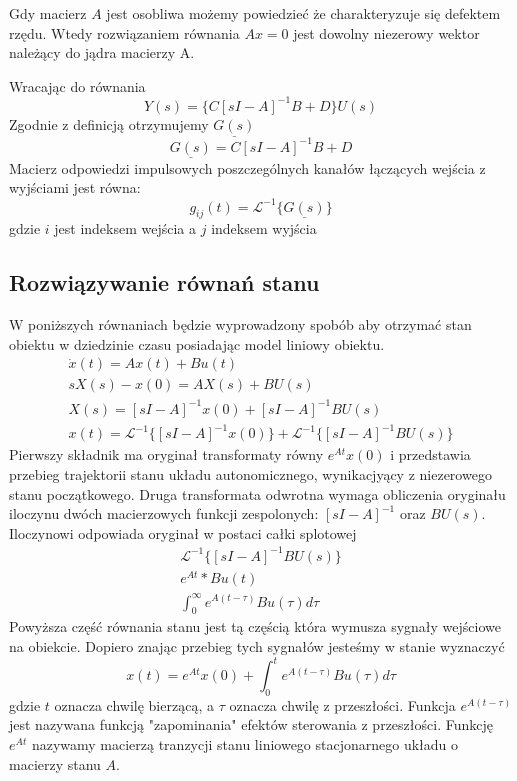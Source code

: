 \documentclass{article}
\begin{document}
		Gdy macierz $A$ jest osobliwa możemy powiedzieć że charakteryzuje się defektem rzędu.
		Wtedy rozwiązaniem równania $Ax=0$ jest dowolny niezerowy wektor należący do 
		jądra macierzy A.
		
		Wracając do równania
		\begin{equation}
			Y(s) = \{C[sI-A]^{-1}B+D\}U(s)
		\end{equation}
		Zgodnie z definicją otrzymujemy $\underline{G(s)}$ 
		\begin{equation}
			\underline{G(s)} = C[sI-A]^{-1}B+D
		\end{equation}
		Macierz odpowiedzi impulsowych poszczególnych kanałów łączących wejścia z
		wyjściami jest równa:
		\begin{equation}
			g_{ij}(t) = \mathcal{L}^{-1}\{ \underline{G(s)} \}
		\end{equation}
		gdzie $i$ jest indeksem wejścia a $j$ indeksem wyjścia
	\subsection{Rozwiązywanie równań stanu}
		W poniższych równaniach będzie wyprowadzony spobób aby otrzymać 
		stan obiektu w dziedzinie czasu posiadając model liniowy obiektu.
		\begin{align*}
			\dot{x}(t) = Ax(t)+Bu(t) \\
			sX(s) - x(0) = AX(s) + BU(s) \\
			X(s) = [sI-A]^{-1}x(0) + [sI-A]^{-1}BU(s) \\
			x(t) = \mathcal{L}^{-1}\{ [sI-A]^{-1}x(0) \} + \mathcal{L}^{-1}\{ [sI-A]^{-1}BU(s) \} 
		\end{align*}
		Pierwszy składnik ma oryginał transformaty równy $e^{At}x(0)$ i przedstawia przebieg
		trajektorii stanu układu autonomicznego, wynikacjyący z niezerowego stanu początkowego.
		Druga transformata odwrotna wymaga obliczenia oryginału iloczynu dwóch macierzowych funkcji zespolonych: $[sI-A]^{-1}$ oraz $BU(s)$. Iloczynowi odpowiada oryginał w postaci całki
		splotowej
		\begin{align*}
			\mathcal{L}^{-1}\{ [sI-A]^{-1}BU(s) \} \\
			e^{At}\ast Bu(t) \\
			\int^{\infty}_0e^{A(t-\tau)}Bu(\tau)d\tau
		\end{align*}
		Powyższa część równania stanu jest tą częścią która wymusza sygnały wejściowe
		na obiekcie. Dopiero znając przebieg tych sygnałów jesteśmy w stanie 
		wyznaczyć 
		\begin{equation}
			x(t) = e^{At}x(0)+\int^t_0e^{A(t-\tau)}Bu(\tau)d\tau
		\end{equation}
		gdzie $t$ oznacza chwilę bierzącą, a $\tau$ oznacza chwilę z przeszłości.
		Funkcja $e^{A(t-\tau)}$ jest nazywana funkcją "zapominania" efektów sterowania
		z przeszłości.
		Funkcję $e^{At}$ nazywamy macierzą tranzycji stanu liniowego stacjonarnego układu o
		macierzy stanu $A$.
\end{document}

